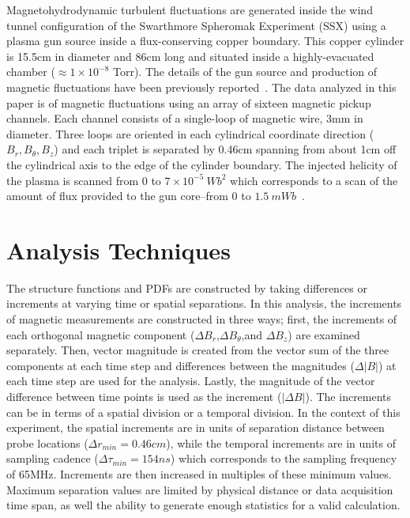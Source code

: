 \documentclass[preprint2]{aastex}
\begin{document}
Magnetohydrodynamic turbulent fluctuations are generated inside the wind tunnel configuration of the Swarthmore Spheromak Experiment (SSX) using a plasma gun source inside a flux-conserving copper boundary. This copper cylinder is 15.5cm in diameter and 86cm long and situated inside a highly-evacuated chamber ($\approx 1 \times 10^{-8}$ Torr). The details of the gun source and production of magnetic fluctuations have been previously reported~\citep{schaffner2014c,brown14,brown15a}. The data analyzed in this paper is of magnetic fluctuations using an array of sixteen magnetic pickup channels. Each channel consists of a single-loop of magnetic wire, 3mm in diameter. Three loops are oriented in each cylindrical coordinate direction ($B_{r},B_{\theta},B_{z}$) and each triplet is separated by 0.46cm spanning from about 1cm off the cylindrical axis to the edge of the cylinder boundary. The injected helicity of the plasma is scanned from $0$ to $7\times 10^{-5}~Wb^{2}$ which corresponds to a scan of the amount of flux provided to the gun core--from $0$ to $1.5~mWb$~\citep{schaffner2014b}.

\section{Analysis Techniques}\label{sec:analysis}

The structure functions and PDFs are constructed by taking differences or increments at varying time or spatial separations. In this analysis, the increments of magnetic measurements are constructed in three ways; first, the increments of each orthogonal magnetic component ($\Delta B_r$,$\Delta B_{\theta}$,and $\Delta B_z$) are examined separately. Then, vector magnitude is created from the vector sum of the three components at each time step and differences between the magnitudes ($\Delta |B|$) at each time step are used for the analysis. Lastly, the magnitude of the vector difference between time points is used as the increment ($|\Delta B|$). The increments can be in terms of a spatial division or a temporal division. In the context of this experiment, the spatial increments are in units of separation distance between probe locations ($\Delta r_{min} = 0.46cm$), while the temporal increments are in units of sampling cadence ($\Delta \tau_{min} = 154ns$) which corresponds to the sampling frequency of 65MHz. Increments are then increased in multiples of these minimum values. Maximum separation values are limited by physical distance or data acquisition time span, as well the ability to generate enough statistics for a valid calculation.
\end{document}

